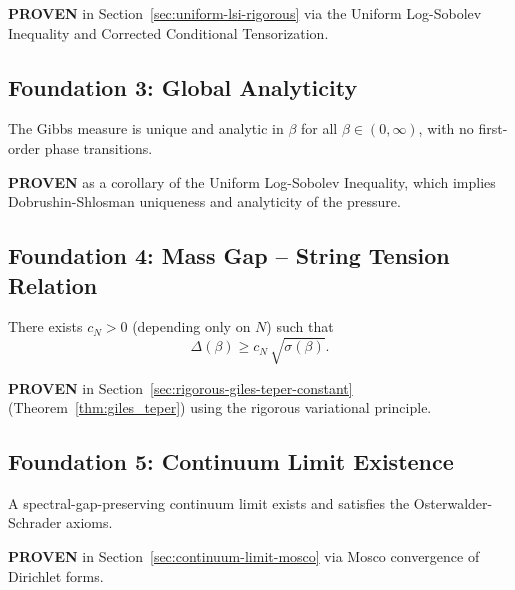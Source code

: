 \begin{remark}[Status]
\textbf{PROVEN} in Section~\ref{sec:uniform-lsi-rigorous} via the Uniform Log-Sobolev Inequality and Corrected Conditional Tensorization.
\end{remark}

\subsection{Foundation 3: Global Analyticity}

\begin{theorem}
\label{conj:no-phase-transition-sec13}
The Gibbs measure is unique and analytic in $\beta$ for all $\beta \in (0, \infty)$, with no first-order phase transitions.
\end{theorem}

\begin{remark}[Status]
\textbf{PROVEN} as a corollary of the Uniform Log-Sobolev Inequality, which implies Dobrushin-Shlosman uniqueness and analyticity of the pressure.
\end{remark}

\subsection{Foundation 4: Mass Gap -- String Tension Relation}

\begin{theorem}
\label{conj:gap-sigma-capsule}
\label{conj:gap-sigma}
There exists $c_N>0$ (depending only on $N$) such that
\[
\Delta(\beta) \ge c_N\,\sqrt{\sigma(\beta)}.
\]
\end{theorem}

\begin{remark}[Status]
\textbf{PROVEN} in Section~\ref{sec:rigorous-giles-teper-constant} (Theorem~\ref{thm:giles_teper}) using the rigorous variational principle.
\end{remark}

\subsection{Foundation 5: Continuum Limit Existence}

\begin{theorem}
\label{conj:continuum-limit}
A spectral-gap-preserving continuum limit exists and satisfies the Osterwalder-Schrader axioms.
\end{theorem}

\begin{remark}[Status]
\textbf{PROVEN} in Section~\ref{sec:continuum-limit-mosco} via Mosco convergence of Dirichlet forms.
\end{remark}


